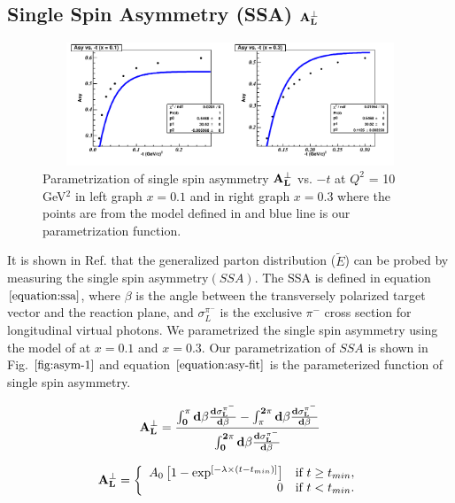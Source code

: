 \subsection{Single Spin Asymmetry (SSA) $\bf{A_{L}^{\perp}}$ 
\label{singlespinasymmetry}}

\begin{figure}[!hbt]
    \centering
    \includegraphics[width=6.0in,height=1.45in]{./figures/asym_3.pdf}
    \caption{ Parametrization of single spin asymmetry $\bf{A_{L}^{\perp}}$
vs. $-t$ at $Q^2$ = 10 GeV$^2$ in left graph $x = 0.1$ and in right graph $x =
0.3$ where the points are from the model defined in \cite{frankfurt} and blue
line is our parametrization function.}
    \label{fig:asym-1}
\end{figure}

It is shown in Ref. \cite{frankfurt} that the generalized parton distribution
($\tilde{E}$) can be probed by measuring the single spin asymmetry$(SSA)$. The
SSA is defined in equation $\ref{equation:ssa}$, where $\beta$ is the angle
between the transversely polarized target vector and the reaction plane, and
$\sigma_{L}^{\pi^{-}}$ is the exclusive $\pi^{-}$ cross section for
longitudinal virtual photons.  We parametrized the single spin asymmetry using
the model of \cite{frankfurt} at $x=0.1$ and $x=0.3$. Our parametrization of
$SSA$ is shown in Fig. $\ref{fig:asym-1}$ and equation
$\ref{equation:asy-fit}$ is the parameterized function of single spin
asymmetry.

\begin{equation}
  \bf{A_{L}^{\perp}} =
\frac{\int^{\pi}_{0}d\beta\frac{d\sigma_{L}^{\pi^{-}}}{d\beta} -
\int^{2\pi}_{\pi}d\beta\frac{d\sigma_{L}^{\pi^{-}}}{d\beta} }
{\int^{2\pi}_{0}d\beta\frac{d\sigma_{L}^{\pi^{-}}}{d\beta}}
     \label{equation:ssa}
\end{equation}

\begin{equation}
        \bf{A_{L}^{\perp}} = \left\{
        \begin{array}{rl}
        A_{0} \left[ 1 - \exp^{ [ -\lambda \times ( t - t_{min} ) ] } \right] & \text{if } t \ge t_{min}, \\
        0 &  \text{if } t < t_{min}.
        \end{array} \right.
     \label{equation:asy-fit}
\end{equation}

